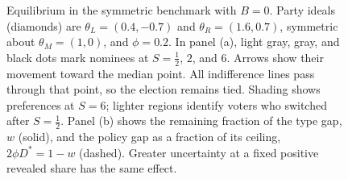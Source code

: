 \documentclass[12pt,letterpaper]{article}
\begin{document}
\begin{figure}[tbp]
\begin{minipage}[b]{0.49\linewidth}
\end{minipage}
\caption{Equilibrium in the symmetric benchmark with $B=0$. Party ideals (diamonds) are $\theta_L=(0.4,-0.7)$ and $\theta_R=(1.6,0.7)$, symmetric about $\theta_M=(1,0)$, and $\phi=0.2$. In panel (a), light gray, gray, and black dots mark nominees at $S=\tfrac12$, $2$, and $6$. Arrows show their movement toward the median point. All indifference lines pass through that point, so the election remains tied. Shading shows preferences at $S=6$; lighter regions identify voters who switched after $S=\tfrac12$. Panel (b) shows the remaining fraction of the type gap, $w$ (solid), and the policy gap as a fraction of its ceiling, $2\phi D^*=1-w$ (dashed). Greater uncertainty at a fixed positive revealed share has the same effect.}
\label{fig:symmetric}
\end{figure}
\end{document}
